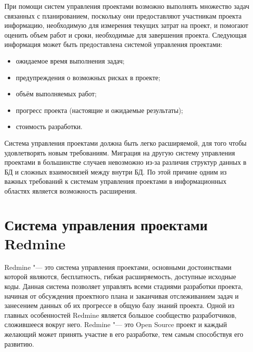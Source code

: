 При помощи систем управления проектами возможно выполнять множество задач
связанных с планированием, поскольку они предоставляют участникам проекта
информацию, необходимую для измерения текущих затрат на проект, и помогают
оценить объем работ и сроки, необходимые для завершения проекта. Следующая
информация может быть предоставлена системой управления проектами:
\begin{itemize}
  \item ожидаемое время выполнения задач;
  \item предупреждения о возможных рисках в проекте;
  \item объём выполняемых работ;
  \item прогресс проекта (настоящие и ожидаемые результаты);
  \item стоимость разработки.
\end{itemize}

Система управления проектами должна быть легко расширяемой, для того чтобы
удовлетворять новым требованиям. Миграция на другую систему управления
проектами в большинстве случаев невозможно из-за различия структур данных в БД
и сложных взаимосвязей между внутри БД. По этой причине одним из важных
требований к системам управления проектами в информационных областях является
возможность расширения.

\section{Система управления проектами Redmine}

Redmine \cite{redmine} "--- это система управления проектами, основными
достоинствами которой являются, бесплатность, гибкая расширяемость, доступные
исходные коды. Данная система позволяет управлять всеми стадиями разработки
проекта, начиная от обсуждения проектного плана и заканчивая отслеживанием
задач и занесением данных об их прогрессе в общую базу знаний проекта. Одной из
главных особенностей Redmine является большое сообщество разработчиков,
сложившееся вокруг него. Redmine "--- это Open Source проект и каждый желающий
может принять участие в его разработке, тем самым способствуя его развитию.

